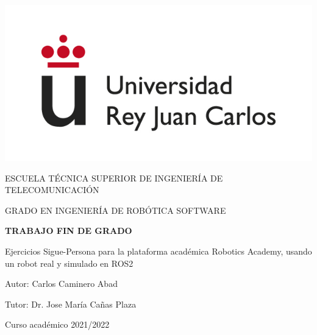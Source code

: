 \thispagestyle{empty}

\begin{titlepage}
	\begin{center}
		\vspace*{3mm}
		\begin{center}
			\includegraphics[width=0.4\linewidth]{imagenes/logo.jpg}
		\end{center}
		\vspace{6.0mm}
		
		\fontsize{15.5}{14}\selectfont ESCUELA TÉCNICA SUPERIOR DE INGENIERÍA DE TELECOMUNICACIÓN
		\vspace{13mm}
		
		\fontsize{14}{14}\selectfont GRADO EN INGENIERÍA DE ROBÓTICA SOFTWARE
		
		\vspace{70pt}
		
		\fontsize{15.7}{14}\selectfont \textbf{TRABAJO FIN DE GRADO} 
		
		\vspace{20mm}
		\begin{LARGE}
			Ejercicios Sigue-Persona para la plataforma académica Robotics Academy, usando un robot real y simulado en ROS2
		\end{LARGE}
		
		\vspace{20mm}
		
		\begin{large}
			Autor: Carlos Caminero Abad
			
			Tutor: Dr. Jose María Cañas Plaza
			
			\vspace{10mm}
		\end{large}
		\begin{normalsize}
			Curso académico 2021/2022		
		\end{normalsize}
		\vspace{10mm}
		
	\end{center}
	
\end{titlepage}

\thispagestyle{empty}